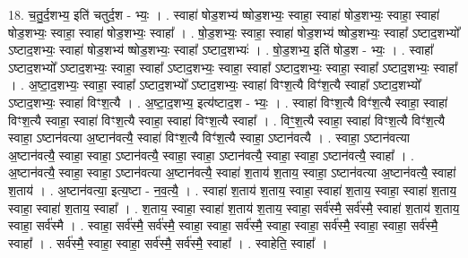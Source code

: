 \documentclass[17pt]{extarticle}
\begin{document}
18. च॒तु॒र्द॒शभ्य॒ इति॑ चतुर्द॒श - भ्यः॒ । . स्वाहा॑ षोड॒शभ्य॑ ष्षोड॒शभ्यः॒ स्वाहा॒ स्वाहा॑ षोड॒शभ्यः॒ स्वाहा॒ स्वाहा॑ षोड॒शभ्यः॒ स्वाहा॒ स्वाहा॑ षोड॒शभ्यः॒ स्वाहा᳚ । . षो॒ड॒शभ्यः॒ स्वाहा॒ स्वाहा॑ षोड॒शभ्य॑ ष्षोड॒शभ्यः॒ स्वाहा᳚ ऽष्टाद॒शभ्यो᳚ ऽष्टाद॒शभ्यः॒ स्वाहा॑ षोड॒शभ्य॑ ष्षोड॒शभ्यः॒ स्वाहा᳚ ऽष्टाद॒शभ्यः॑ । . षो॒ड॒शभ्य॒ इति॑ षोड॒श - भ्यः॒ । . स्वाहा᳚ ऽष्टाद॒शभ्यो᳚ ऽष्टाद॒शभ्यः॒ स्वाहा॒ स्वाहा᳚ ऽष्टाद॒शभ्यः॒ स्वाहा॒ स्वाहा᳚ ऽष्टाद॒शभ्यः॒ स्वाहा॒ स्वाहा᳚ ऽष्टाद॒शभ्यः॒ स्वाहा᳚ । . अ॒ष्टा॒द॒शभ्यः॒ स्वाहा॒ स्वाहा᳚ ऽष्टाद॒शभ्यो᳚ ऽष्टाद॒शभ्यः॒ स्वाहा॑ विꣳश॒त्यै विꣳ॑श॒त्यै स्वाहा᳚ ऽष्टाद॒शभ्यो᳚ ऽष्टाद॒शभ्यः॒ स्वाहा॑ विꣳश॒त्यै । . अ॒ष्टा॒द॒शभ्य॒ इत्य॑ष्टाद॒श - भ्यः॒ । . स्वाहा॑ विꣳश॒त्यै विꣳ॑श॒त्यै स्वाहा॒ स्वाहा॑ विꣳश॒त्यै स्वाहा॒ स्वाहा॑ विꣳश॒त्यै स्वाहा॒ स्वाहा॑ विꣳश॒त्यै स्वाहा᳚ । . विꣳ॒॒श॒त्यै स्वाहा॒ स्वाहा॑ विꣳश॒त्यै विꣳ॑श॒त्यै स्वाहा॒ ऽष्टान॑वत्या अ॒ष्टान॑वत्यै॒ स्वाहा॑ विꣳश॒त्यै विꣳ॑श॒त्यै स्वाहा॒ ऽष्टान॑वत्यै । . स्वाहा॒ ऽष्टान॑वत्या अ॒ष्टान॑वत्यै॒ स्वाहा॒ स्वाहा॒ ऽष्टान॑वत्यै॒ स्वाहा॒ स्वाहा॒ ऽष्टान॑वत्यै॒ स्वाहा॒ स्वाहा॒ ऽष्टान॑वत्यै॒ स्वाहा᳚ । . अ॒ष्टान॑वत्यै॒ स्वाहा॒ स्वाहा॒ ऽष्टान॑वत्या अ॒ष्टान॑वत्यै॒ स्वाहा॑ श॒ताय॑ श॒ताय॒ स्वाहा॒ ऽष्टान॑वत्या अ॒ष्टान॑वत्यै॒ स्वाहा॑ श॒ताय॑ । . अ॒ष्टान॑वत्या॒ इत्य॒ष्टा - न॒व॒त्यै॒ । . स्वाहा॑ श॒ताय॑ श॒ताय॒ स्वाहा॒ स्वाहा॑ श॒ताय॒ स्वाहा॒ स्वाहा॑ श॒ताय॒ स्वाहा॒ स्वाहा॑ श॒ताय॒ स्वाहा᳚ । . श॒ताय॒ स्वाहा॒ स्वाहा॑ श॒ताय॑ श॒ताय॒ स्वाहा॒ सर्व॑स्मै॒ सर्व॑स्मै॒ स्वाहा॑ श॒ताय॑ श॒ताय॒ स्वाहा॒ सर्व॑स्मै । . स्वाहा॒ सर्व॑स्मै॒ सर्व॑स्मै॒ स्वाहा॒ स्वाहा॒ सर्व॑स्मै॒ स्वाहा॒ स्वाहा॒ सर्व॑स्मै॒ स्वाहा॒ स्वाहा॒ सर्व॑स्मै॒ स्वाहा᳚ । . सर्व॑स्मै॒ स्वाहा॒ स्वाहा॒ सर्व॑स्मै॒ सर्व॑स्मै॒ स्वाहा᳚ । . स्वाहेति॒ स्वाहा᳚ । \newline
\pagebreak
{}
\end{document}
